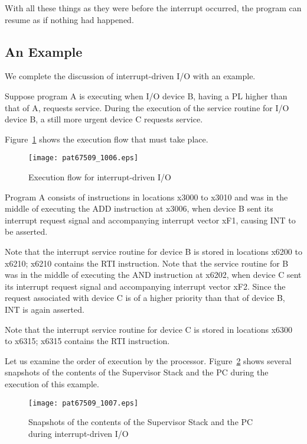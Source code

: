 \documentclass{patt}
\begin{document}
With all these things as they were before the interrupt occurred, the
program can resume as if nothing had happened.

\subsection{An Example}

We complete the discussion of interrupt-driven I/O with an example.

Suppose program A is executing when I/O device B, having a PL higher
than that of A, requests service. During the execution of the service
routine for I/O device B, a still more urgent device C requests
service.

Figure~\ref{fig:execution.flow.interrupt.IO} shows the execution flow
that must take place.

\begin{figure}[h!]
\centerline{\texttt{[image: pat67509\_1006.eps]}}
\caption{Execution flow for interrupt-driven I/O}
\label{fig:execution.flow.interrupt.IO}
\end{figure}

Program A consists of instructions in locations x3000 to x3010 and was
in the middle of executing the ADD instruction at x3006, when device B
sent its interrupt request signal and accompanying interrupt vector
xF1, causing INT to be asserted.

Note that the interrupt service routine for device B is stored in
locations x6200 to x6210; x6210 contains the RTI instruction. Note
that the service routine for B was in the middle of executing the AND
instruction at x6202, when device C sent its interrupt request signal and
accompanying interrupt vector xF2. Since the request associated with
device C is of a higher priority than that of device B, INT is again
asserted.

Note that the interrupt service routine for device C is stored in
locations x6300 to x6315; x6315 contains the RTI instruction.

Let us examine the order of execution by the
processor. Figure~\ref{fig:stack.pc.interrupt.IO} shows several
snapshots of the contents of the Supervisor Stack and the PC during
the execution of this example.

\begin{figure}[h!]
\centerline{\texttt{[image: pat67509\_1007.eps]}}
\caption{Snapshots of the contents of the Supervisor Stack and the PC during interrupt-driven I/O}
\label{fig:stack.pc.interrupt.IO}
\end{figure}
\end{document}
